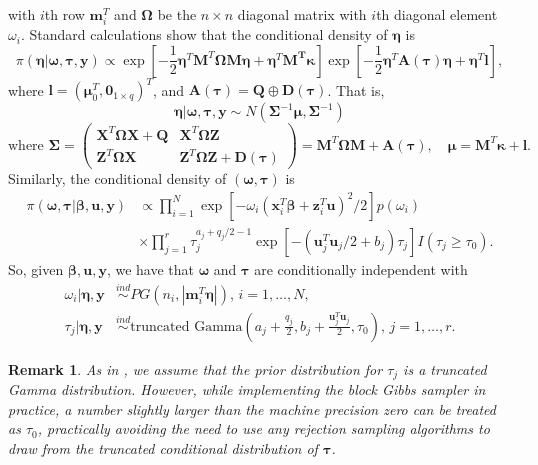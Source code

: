\documentclass[11pt,a4paper]{article}
\newtheorem{remark}{Remark}
\begin{document}
with $i$th row $\bm{m}_{i}^T$ and $\bm{\Omega}$ be the $n\times n$ diagonal matrix
with $i$th diagonal element $\omega_{i}$. Standard calculations show
that the conditional density of $\bm{\eta}$ is
\[
\pi\left(\bm{\eta}|\bm{\omega},\bm{\tau},\bm{y}\right)\propto\exp\left[-\frac{1}{2}\bm{\eta}^{T}\bm{M}^{T}\bm{\Omega}\bm{M}\bm{\eta}+\bm{\eta}^{T}\bm{M^T\kappa}\right]\exp\left[-\frac{1}{2}\bm{\eta}^{T}\bm{A}\left(\bm{\tau}\right)\bm{\eta}+\bm{\eta}^{T}\bm{l}\right],
\]
where $\bm{l}=\left(\bm{\mu}_{0}^{T},\bm{0}_{1\times q}\right)^{T}$, and $\bm{A}\left(\bm{\tau}\right) = \bm{Q} \oplus \bm{D}(\bm{\tau})$. That is,  \begin{equation}
\label{eq_eta}
\bm{\eta}|\bm{\omega},\bm{\tau},\bm{y}\sim N\left(\bm{\Sigma}^{-1}\bm{\mu},\bm{\Sigma}^{-1}\right)
\end{equation}
\[
\text{where }
\bm{\Sigma}=\left(\begin{array}{cc}
\bm{X}^{T}\bm{\Omega}\bm{X}+\bm{Q} & \bm{X}^{T}\bm{\Omega}\bm{Z}\\
\bm{Z}^{T}\bm{\Omega}\bm{X} & \bm{Z}^{T}\bm{\Omega}\bm{Z}+\bm{D}(\bm{\tau})
\end{array}\right)=\bm{M}^{T}\bm{\Omega}\bm{M}+\bm{A}\left(\bm{\tau}\right),\quad\bm{\mu}=\bm{M}^{T}\bm{\kappa}+\bm{l}.
\]
Similarly, the conditional density of $\left(\bm{\omega},\bm{\tau}\right)$ is
\begin{align*}
\pi\left(\bm{\omega},\bm{\tau}|\bm{\beta},\bm{u},\bm{y}\right) & \propto\prod_{i=1}^{N}\exp\left[-\omega_{i}\left(\bm{x}_{i}^{T}\bm{\beta}+\bm{z}_{i}^{T}\bm{u}\right)^{2}/2\right]p\left(\omega_{i}\right)\\
& \times\prod_{j=1}^{r}\tau_{j}^{a_{j}+q_{j}/2-1}\exp\left[-\left(\bm{u}_{j}^{T}\bm{u}_{j}/2+b_{j}\right)\tau_{j} \right] I(\tau_j \geq \tau_0).
\end{align*}
So, given $\bm{\beta},\bm{u}, \bm{y}$, we have that $\bm{\omega}$ and $\bm{\tau}$ are conditionally independent with 
\begin{align*}
\omega_{i}|\bm{\eta},\bm{y} & \overset{ind} \sim PG\left(n_i,|\bm{m}_{i}^{T}\bm{\eta}|\right),\, i=1,\dots,N,\\
\tau_{j}|\bm{\eta},\bm{y} & \overset{ind} \sim\text{truncated Gamma}\left(a_{j}+\frac{q_{j}}{2},b_{j}+\frac{\bm{u}_{j}^{T}\bm{u}_{j}}{2}, \tau_0\right), \, j=1,\dots,r.
\end{align*}

\begin{remark}
	\label{rem:tau0}
As in \cite{wang2017convergence}, we assume that the prior distribution for $\tau_j$ is a truncated Gamma distribution. However, while implementing the block Gibbs sampler in practice, a number slightly larger than the machine precision zero can be treated as $\tau_0$, practically avoiding the need to use any rejection sampling algorithms to draw from the truncated
	conditional distribution of $\bm{\tau}$. 
\end{remark}
\end{document}
